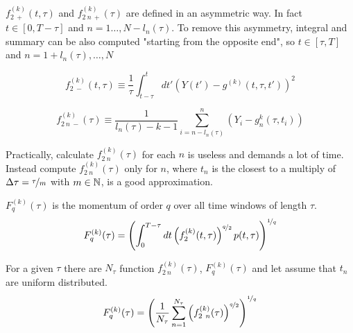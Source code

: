 \begin{step}
$f_{2 \ +}^{( k )}( t, \tau )$ and $f_{2\ n \ +}^{( k )}( \tau )$ are defined in an asymmetric way. In fact $t \in [0, T-\tau]$ and $n = 1 \dots, N - l_n(\tau)$. 
To remove this asymmetry, integral and summary can be also computed "starting from the opposite end", so $t \in [\tau, T]$ and $n = 1 + l_n(\tau), \dots, N$

\begin{equation}
	f_{2 \ -}^{( k )}( t, \tau ) \equiv \frac{1}{\tau} \int_{t-\tau}^{t} dt' \left( Y( t' ) - g^{( k )}(t, \tau, t')  \right)^2
\end{equation}

\begin{equation}
	f_{2\ n \ -}^{( k )}( \tau ) \equiv \frac{1}{l_n(\tau) - k - 1} \sum_{i=n - l_n(\tau)}^{n} \left(Y_i - g_n^{k} (\tau, t_i) \right)
\end{equation}

Practically, calculate $f_{2\ n}^{( k )}( \tau )$ for each $n$ is useless and demands a lot of time.  Instead compute $f_{2\ n}^{( k )}( \tau )$ only for $n$, where $t_n$ is the closest to a multiply of $\Delta \tau = \nicefrac{\tau}{m}$ with $m \in \mathbb{N}$, is a good approximation.
\end{step}

\begin{step}\label{step4}
$F_q^{( k )}(\tau )$ is the momentum of order $q$ over all time windows of length $\tau$.
\begin{equation}
	F_q^{( k )} ( \tau ) =  \left(\int_0^{T-\tau} dt \left( f_2^{( k )}( t, \tau ) \right)^{\nicefrac{q}{2}} p(t, \tau)  \right)^{\nicefrac{1}{q}}
\end{equation}

For a given $\tau$ there are $N_\tau$ function $f_{2\ n}^{( k )}( \tau )$, $F_q^{( k )} ( \tau )$ and let assume that $t_n$ are uniform distributed.
\begin{equation}
	F_q^{( k )} ( \tau ) = \left( \frac{1}{N_\tau} \sum_{n=1}^{N_\tau} \left( f_{2\ n}^{( k )}( \tau ) \right)^{\nicefrac{q}{2}} \right)^{\nicefrac{1}{q}}
\end{equation}
\end{step}

